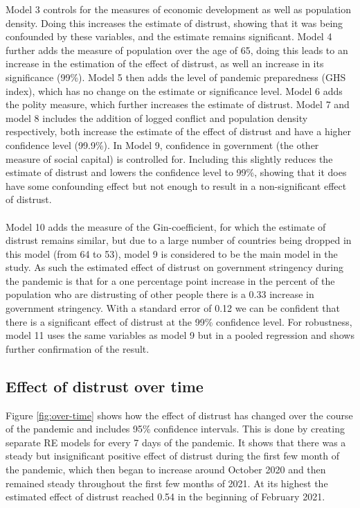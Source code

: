 \documentclass[
  11pt,
]{article}
\begin{document}
Model 3 controls for the measures of economic development as well as population density. Doing this increases the estimate of distrust, showing that it was being confounded by these variables, and the estimate remains significant. Model 4 further adds the measure of population over the age of 65, doing this leads to an increase in the estimation of the effect of distrust, as well an increase in its significance (99\%). Model 5 then adds the level of pandemic preparedness (GHS index), which has no change on the estimate or significance level. Model 6 adds the polity measure, which further increases the estimate of distrust. Model 7 and model 8 includes the addition of logged conflict and population density respectively, both increase the estimate of the effect of distrust and have a higher confidence level (99.9\%). In Model 9, confidence in government (the other measure of social capital) is controlled for. Including this slightly reduces the estimate of distrust and lowers the confidence level to 99\%, showing that it does have some confounding effect but not enough to result in a non-significant effect of distrust.\\
~\\
Model 10 adds the measure of the Gin-coefficient, for which the estimate of distrust remains similar, but due to a large number of countries being dropped in this model (from 64 to 53), model 9 is considered to be the main model in the study. As such the estimated effect of distrust on government stringency during the pandemic is that for a one percentage point increase in the percent of the population who are distrusting of other people there is a 0.33 increase in government stringency. With a standard error of 0.12 we can be confident that there is a significant effect of distrust at the 99\% confidence level. For robustness, model 11 uses the same variables as model 9 but in a pooled regression and shows further confirmation of the result.\\

\hypertarget{effect-of-distrust-over-time}{%
\subsection{Effect of distrust over time}\label{effect-of-distrust-over-time}}

Figure \ref{fig:over-time} shows how the effect of distrust has changed over the course of the pandemic and includes 95\% confidence intervals. This is done by creating separate RE models for every 7 days of the pandemic. It shows that there was a steady but insignificant positive effect of distrust during the first few month of the pandemic, which then began to increase around October 2020 and then remained steady throughout the first few months of 2021. At its highest the estimated effect of distrust reached 0.54 in the beginning of February 2021.\\
\end{document}

